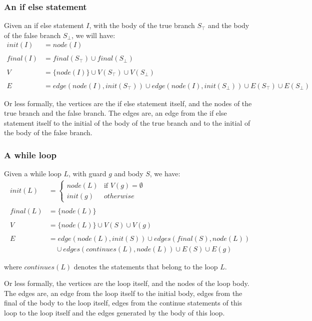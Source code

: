 \subsubsection*{An if else statement}
Given an if else statement $I$, with the body of the true branch $S_\top$ and the
body of the false branch $S_\bot$, we will have:
\begin{align*}
    init(I)  &= node(I) \\ \\
    final(I) &= final(S_\top) \cup final(S_\bot) \\ \\
    V        &= \{node(I)\} \cup V(S_\top) \cup V(S_\bot) \\ \\
    E        &= edge(node(I), init(S_\top)) \cup edge(node(I), init(S_\bot)) 
                \cup E(S_\top) \cup E(S_\bot)
\end{align*}

Or less formally, the vertices are the if else statement itself, and the nodes
of the true branch and the false branch. The edges are, an edge from the 
if else statement itself to the initial of the body of the true branch and to
the initial of the body of the false branch.

\subsubsection*{A while loop}
Given a while loop $L$, with guard $g$ and body $S$, we have:
\begin{align*}
    init(L) &=
    \begin{cases}
      node(L) & \text{if } V(g) = \emptyset \\
      init(g) & otherwise
    \end{cases} \\ \\
    final(L) &= \{node(L)\} \\ \\
    V &= \{node(L)\} \cup V(S) \cup V(g) \\ \\
    E &= edge(node(L), init(S)) \cup edges(final(S), node(L))
       \\ & \quad \cup edges(continues(L), node(L)) \cup E(S) \cup E(g)
\end{align*}

where $continues(L)$ denotes the  statements that belong
to the loop $L$.

Or less formally, the vertices are the loop itself, and the nodes of the loop 
body. The edges are, an edge from the loop itself to the initial body, edges from
the final of the body to the loop itself, edges from the continue statements of
this loop to the loop itself and the edges generated by the body of this loop.

